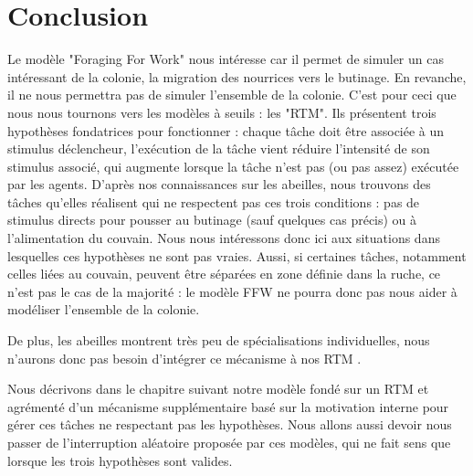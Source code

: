 			
	\section*{Conclusion}
	Le modèle "Foraging For Work" nous intéresse car il permet de simuler un cas intéressant de la colonie, la migration des nourrices vers le butinage. En revanche, il ne nous permettra pas de simuler l'ensemble de la colonie. C'est pour ceci que nous nous tournons vers les modèles à seuils : les "RTM". Ils présentent trois hypothèses fondatrices pour fonctionner : chaque tâche doit être associée à un stimulus déclencheur, l'exécution de la tâche vient réduire l'intensité de son stimulus associé, qui augmente lorsque la tâche n'est pas (ou pas assez) exécutée par les agents.
	D'après nos connaissances sur les abeilles, nous trouvons des tâches qu'elles réalisent qui ne respectent pas ces trois conditions : pas de stimulus directs pour pousser au butinage (sauf quelques cas précis) ou à l'alimentation du couvain. Nous nous intéressons donc ici aux situations dans lesquelles ces hypothèses ne sont pas vraies. Aussi, si certaines tâches, notamment celles liées au couvain, peuvent être séparées en zone définie dans la ruche, ce n'est pas le cas de la majorité : le modèle FFW ne pourra donc pas nous aider à modéliser l'ensemble de la colonie.
	
	De plus, les abeilles montrent très peu de spécialisations individuelles, nous n'aurons donc pas besoin d'intégrer ce mécanisme à nos RTM \cite{kolmes_quantitative_1984}.
	
	 Nous décrivons dans le chapitre suivant notre modèle fondé sur un RTM et agrémenté d'un mécanisme supplémentaire basé sur la motivation interne pour gérer ces tâches ne respectant pas les hypothèses. Nous allons aussi devoir nous passer de l'interruption aléatoire proposée par ces modèles, qui ne fait sens que lorsque les trois hypothèses sont valides.
